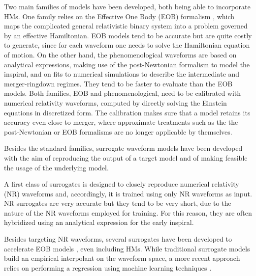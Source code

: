 \documentclass[twocolumn,showpacs,preprintnumbers,nofootinbib,prd,
superscriptaddress,10pt]{revtex4-1}
\begin{document}
Two main families of models have been developed, both being able to incorporate HMs.
One family relies on the Effective One Body (EOB) formalism 
\cite{Buonanno:2000ef, Damour:2009kr, Cotesta:2018fcv, Nagar:2020pcj, Chiaramello:2020ehz, Ossokine:2020kjp, Ramos-Buades:2023ehm, Nagar:2021gss}, 
which maps the complicated general relativistic binary system into a problem governed by an effective Hamiltonian. 
EOB models tend to be accurate but are quite costly to generate, since for each waveform one needs to solve the 
Hamiltonian equation of motion.
On the other hand, the phenomenological waveforms \cite{Khan:2015jqa,Pratten:2020ceb,Estelles:2020osj} are based on 
analytical expressions, making use of the post-Newtonian formalism to model the inspiral, and on fits to numerical
simulations to describe the intermediate and merger-ringdown regimes. They tend to be faster to evaluate than the EOB models.
Both families, EOB and phenomenological, need to be calibrated with numerical relativity waveforms, 
computed by directly solving the Einstein equations in discretized form. The calibration makes sure that a model 
retains its accuracy even close to merger, where approximate treatments such as the the post-Newtonian or EOB formalisms 
are no longer applicable by themselves.

Besides the standard families, surrogate waveform models have been developed with the aim of reproducing the 
output of a target model and of making feasible the usage of the underlying model.

A first class of surrogates is designed to closely reproduce numerical relativity (NR) waveforms \cite{Blackman:2015pia, Varma:2018mmi, Blackman:2017dfb, Blackman:2017pcm, Varma:2019csw, Williams:2019vub, Rifat:2019ltp} and, accordingly, it is trained using only NR waveforms as input. NR surrogates are very accurate but they tend to be very short, due to the nature of the NR waveforms employed for training. For this reason, they are often hybridized using an analytical expression for the early inspiral.

Besides targeting NR waveforms, several surrogates have been developed to accelerate EOB models \cite{Field:2013cfa, Purrer:2014fza, Purrer:2015tud, Cotesta:2020qhw, Gadre:2022sed}, even including HMs. While traditional surrogate 
models build an empirical interpolant on the waveform space, a more recent approach relies on performing a regression 
using machine learning techniques \cite{Chua:2018woh, Khan:2020fso, Thomas:2022rmc, Tissino:2022thn}.
\end{document}
